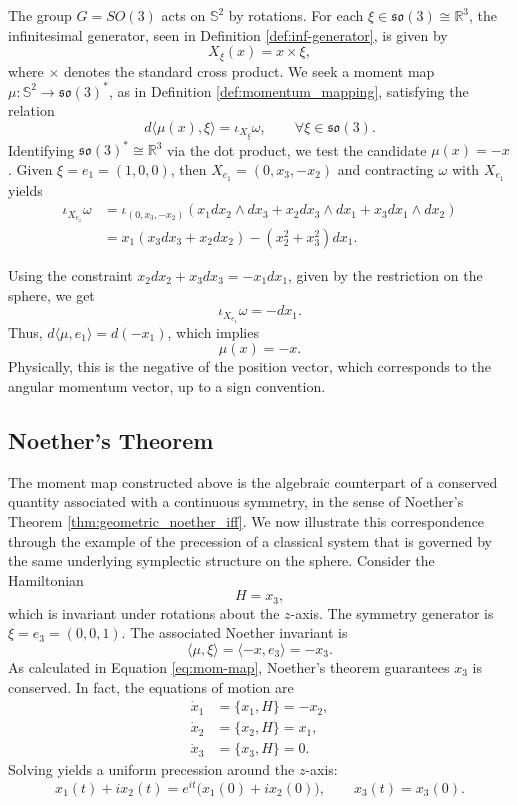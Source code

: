			The group \(G = SO(3)\) acts on \(\mathbb{S}^2\) by rotations. For each \(\xi \in \mathfrak{so}(3) \cong \mathbb{R}^3\), the infinitesimal generator, seen in Definition \ref{def:inf-generator}, is given by
			\[
			X_\xi(x) = x \times \xi,
			\]
			where \(\times\) denotes the standard cross product. We seek a moment map \(\mu: \mathbb{S}^2 \to \mathfrak{so}(3)^*\), as in Definition \ref{def:momentum_mapping}, satisfying the relation
			\[
			d\langle \mu(x), \xi \rangle = \iota_{X_\xi} \omega, \qquad \forall \xi \in \mathfrak{so}(3).
			\]
			Identifying \(\mathfrak{so}(3)^* \cong \mathbb{R}^3\) via the dot product, we test the candidate \(\mu(x) = -x\). Given \(\xi = e_1 = (1,0,0)\), then \(X_{e_1} = (0, x_3, -x_2)\) and contracting \(\omega\) with \(X_{e_1}\) yields
			\begin{align*}
				\iota_{X_{e_1}} \omega 
				&= \iota_{(0,x_3,-x_2)} \left( x_1 dx_2 \wedge dx_3 + x_2 dx_3 \wedge dx_1 + x_3 dx_1 \wedge dx_2 \right) \nonumber \\
				&= x_1(x_3 dx_3 + x_2 dx_2) - (x_2^2+x_3^2) dx_1.
			\end{align*}
			
			\noindent Using the constraint \(x_2 dx_2 + x_3 dx_3 = -x_1 dx_1\), given by the restriction on the sphere, we get
			\[
			\iota_{X_{e_1}} \omega = -dx_1.
			\]
			\noindent Thus, \(d\langle \mu, e_1 \rangle = d(-x_1)\), which implies
			\begin{equation}
				\boxed{\mu(x) = -x.}\label{eq:mom-map}
			\end{equation}
			\noindent Physically, this is the negative of the position vector, which corresponds to the angular momentum vector, up to a sign convention.
			
			\subsection*{Noether's Theorem}
			The moment map constructed above is the algebraic counterpart of a conserved quantity associated with a continuous symmetry, in the sense of Noether's Theorem \ref{thm:geometric_noether_iff}. We now illustrate this correspondence through the example of the precession of a classical system that is governed by the same underlying symplectic structure on the sphere.
			\medskip
			Consider the Hamiltonian
			\[
			H = x_3,
			\]
			which is invariant under rotations about the \(z\)-axis. The symmetry generator is \(\xi = e_3 = (0,0,1)\). The associated Noether invariant is
			\[
			\langle \mu, \xi \rangle = \langle -x, e_3 \rangle = -x_3.
			\]
			As calculated in Equation \eqref{eq:mom-map}, Noether's theorem guarantees \(x_3\) is conserved. In fact, the equations of motion are
			\begin{align*}
				\dot{x}_1 &= \{x_1, H\} = -x_2, \\
				\dot{x}_2 &= \{x_2, H\} = x_1, \\
				\dot{x}_3 &= \{x_3, H\} = 0.
			\end{align*}
			Solving yields a uniform precession around the \(z\)-axis:
			\[
			x_1(t) + i x_2(t) = e^{it} \big(x_1(0) + i x_2(0)\big), \qquad x_3(t) = x_3(0).
		\]